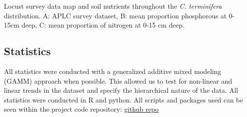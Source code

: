 \documentclass[
]{article}
\begin{document}
\begin{fig}


\caption{\label{fig-spatial-modeling-env-map}Locust survey data map and
soil nutrients throughout the \emph{C. terminifera} distribution. A:
APLC survey dataset, B: mean proportion phosphorous at 0-15cm deep, C:
mean proportion of nitrogen at 0-15 cm deep.}

\end{fig}%

\subsection{Statistics}\label{statistics}

All statistics were conducted with a generalized additive mixed modeling
(GAMM) approach when possible. This allowed us to test for non-linear
and linear trends in the dataset and specify the hierarchical nature of
the data. All statistics were conducted in R and python. All scripts and
packages used can be seen within the project code repository:
\href{./path/to/repo}{github repo}
\end{document}
